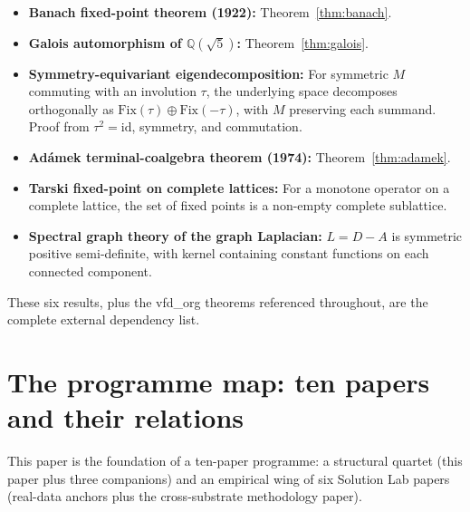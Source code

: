 \documentclass[11pt]{article}
\theoremstyle{plain}
\theoremstyle{definition}
\theoremstyle{remark}
\newcommand{\Fix}{\mathrm{Fix}}
\begin{document}
\begin{itemize}[leftmargin=2em]
\item \textbf{Banach fixed-point theorem (1922):} Theorem~\ref{thm:banach}.
\item \textbf{Galois automorphism of $\mathbb{Q}(\sqrt{5})$:} Theorem~\ref{thm:galois}.
\item \textbf{Symmetry-equivariant eigendecomposition:} For symmetric $M$ commuting with an involution $\tau$, the underlying space decomposes orthogonally as $\Fix(\tau) \oplus \Fix(-\tau)$, with $M$ preserving each summand. Proof from $\tau^2 = \mathrm{id}$, symmetry, and commutation.
\item \textbf{Adámek terminal-coalgebra theorem (1974):} Theorem~\ref{thm:adamek}.
\item \textbf{Tarski fixed-point on complete lattices:} For a monotone operator on a complete lattice, the set of fixed points is a non-empty complete sublattice.
\item \textbf{Spectral graph theory of the graph Laplacian:} $L = D - A$ is symmetric positive semi-definite, with kernel containing constant functions on each connected component.
\end{itemize}

These six results, plus the vfd\_org theorems referenced throughout, are the complete external dependency list.

\section{The programme map: ten papers and their relations}\label{sec:programme-map}

This paper is the foundation of a ten-paper programme: a structural quartet (this paper plus three companions) and an empirical wing of six Solution Lab papers (real-data anchors plus the cross-substrate methodology paper).
\end{document}

